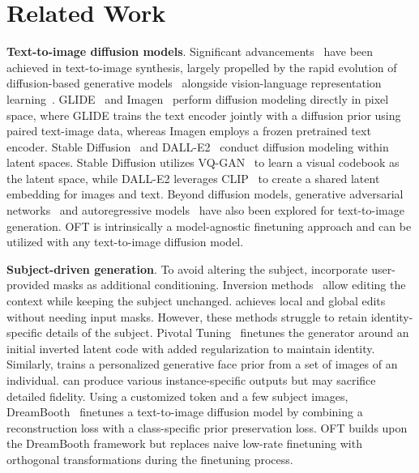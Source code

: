 \section{Related Work}

\textbf{Text-to-image diffusion models}. Significant advancements~\cite{saharia2022photorealistic,ramesh2022hierarchical,rombach2022high,gu2022vector,nichol2022glide} have been achieved in text-to-image synthesis, largely propelled by the rapid evolution of diffusion-based generative models~\cite{ho2020denoising,song2021score,song2021denoising,dhariwal2021diffusion} alongside vision-language representation learning~\cite{su2020vlbert,lu2019vilbert,radford2021learning,wang2021simvlm,li2022blip,li2023blip,alayrac2022flamingo,schuhmann2022laion}. GLIDE~\cite{nichol2022glide} and Imagen~\cite{saharia2022photorealistic} perform diffusion modeling directly in pixel space, where GLIDE trains the text encoder jointly with a diffusion prior using paired text-image data, whereas Imagen employs a frozen pretrained text encoder. Stable Diffusion~\cite{rombach2022high} and DALL-E2~\cite{ramesh2022hierarchical} conduct diffusion modeling within latent spaces. Stable Diffusion utilizes VQ-GAN~\cite{esser2021taming} to learn a visual codebook as the latent space, while DALL-E2 leverages CLIP~\cite{radford2021learning} to create a shared latent embedding for images and text. Beyond diffusion models, generative adversarial networks~\cite{reed2016generative,zhang2017stackgan,xu2018attngan,li2019controllable} and autoregressive models~\cite{ramesh2021zero,ding2021cogview,wu2022nuwa,yuscaling} have also been explored for text-to-image generation. OFT is intrinsically a model-agnostic finetuning approach and can be utilized with any text-to-image diffusion model.

\textbf{Subject-driven generation}. To avoid altering the subject, \cite{avrahami2022blended,nichol2022glide} incorporate user-provided masks as additional conditioning. Inversion methods~\cite{choi2021ilvr,dhariwal2021diffusion,ramesh2022hierarchical,gal2022image} allow editing the context while keeping the subject unchanged. \cite{hertz2022prompt} achieves local and global edits without needing input masks. However, these methods struggle to retain identity-specific details of the subject. Pivotal Tuning~\cite{roich2022pivotal} finetunes the generator around an initial inverted latent code with added regularization to maintain identity. Similarly, \cite{nitzan2022mystyle} trains a personalized generative face prior from a set of images of an individual. \cite{casanova2021instance} can produce various instance-specific outputs but may sacrifice detailed fidelity. Using a customized token and a few subject images, DreamBooth~\cite{ruiz2023dreambooth} finetunes a text-to-image diffusion model by combining a reconstruction loss with a class-specific prior preservation loss. OFT builds upon the DreamBooth framework but replaces naive low-rate finetuning with orthogonal transformations during the finetuning process.

